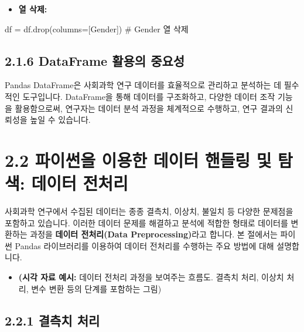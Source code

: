 \documentclass[
  letterpaper,
]{book}
\newenvironment{Shaded}{\begin{snugshade}}{\end{snugshade}}
\newcommand{\CommentTok}[1]{\textcolor[rgb]{0.37,0.37,0.37}{#1}}
\newcommand{\NormalTok}[1]{\textcolor[rgb]{0.00,0.23,0.31}{#1}}
\newcommand{\OperatorTok}[1]{\textcolor[rgb]{0.37,0.37,0.37}{#1}}
\newcommand{\StringTok}[1]{\textcolor[rgb]{0.13,0.47,0.30}{#1}}
\providecommand{\tightlist}{%
  \setlength{\itemsep}{0pt}\setlength{\parskip}{0pt}}
\begin{document}
\begin{itemize}
\tightlist
\item
  \textbf{열 삭제:}
\end{itemize}

\begin{Shaded}
\begin{Highlighting}[]
\NormalTok{    df }\OperatorTok{=}\NormalTok{ df.drop(columns}\OperatorTok{=}\NormalTok{[}\StringTok{\textquotesingle{}Gender\textquotesingle{}}\NormalTok{]) }\CommentTok{\# \textquotesingle{}Gender\textquotesingle{} 열 삭제}
\end{Highlighting}
\end{Shaded}

\subsection{2.1.6 DataFrame 활용의
중요성}\label{dataframe-uxd65cuxc6a9uxc758-uxc911uxc694uxc131}

Pandas DataFrame은 사회과학 연구 데이터를 효율적으로 관리하고 분석하는
데 필수적인 도구입니다. DataFrame을 통해 데이터를 구조화하고, 다양한
데이터 조작 기능을 활용함으로써, 연구자는 데이터 분석 과정을 체계적으로
수행하고, 연구 결과의 신뢰성을 높일 수 있습니다.

\section{2.2 파이썬을 이용한 데이터 핸들링 및 탐색: 데이터
전처리}\label{uxd30cuxc774uxc36cuxc744-uxc774uxc6a9uxd55c-uxb370uxc774uxd130-uxd578uxb4e4uxb9c1-uxbc0f-uxd0d0uxc0c9-uxb370uxc774uxd130-uxc804uxcc98uxb9ac}

사회과학 연구에서 수집된 데이터는 종종 결측치, 이상치, 불일치 등 다양한
문제점을 포함하고 있습니다. 이러한 데이터 문제를 해결하고 분석에 적합한
형태로 데이터를 변환하는 과정을 \textbf{데이터 전처리(Data
Preprocessing)}라고 합니다. 본 절에서는 파이썬 Pandas 라이브러리를
이용하여 데이터 전처리를 수행하는 주요 방법에 대해 설명합니다.

\begin{itemize}
\tightlist
\item
  \textbf{(시각 자료 예시:} 데이터 전처리 과정을 보여주는 흐름도. 결측치
  처리, 이상치 처리, 변수 변환 등의 단계를 포함하는 그림)
\end{itemize}

\subsection{2.2.1 결측치 처리}\label{uxacb0uxce21uxce58-uxcc98uxb9ac}
\end{document}
